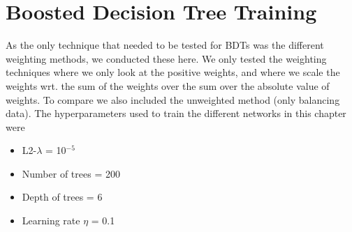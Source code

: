 \documentclass[12pt, a4paper]{book}
\begin{document}
\section{Boosted Decision Tree Training}
As the only technique that needed to be tested for BDTs was the different weighting methods, we conducted these here. We only tested the weighting techniques where we only look at the positive weights, and where we scale the weights 
wrt. the sum of the weights over the sum over the absolute value of weights. To compare we also included the unweighted method (only balancing data). The hyperparameters used to train the different networks in this chapter were
\begin{itemize}
   \item L2-$\lambda$ = 10$^{-5}$
   \item Number of trees = 200
   \item Depth of trees = 6
   \item Learning rate $\eta$ = 0.1
\end{itemize}
\clearpage
\end{document}
